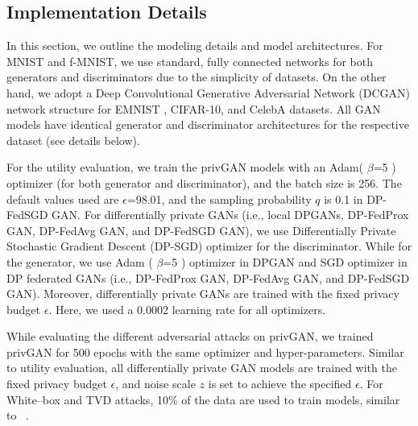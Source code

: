 \onecolumn
\appendix


\subsection{Implementation Details}


In this section, we outline the modeling details and model architectures. For MNIST and f-MNIST, we use standard, fully connected networks for both generators and discriminators due to the simplicity of datasets. On the other hand, we adopt a Deep Convolutional Generative Adversarial Network (DCGAN) network structure for EMNIST \cite{cohen2017emnist}, CIFAR-10, and CelebA datasets. All GAN models have identical generator and discriminator architectures for the respective dataset (see details below). 


For the utility evaluation, we train the privGAN models with an Adam( $\beta$=5 ) optimizer (for both generator and discriminator), and the batch size is 256. The default values used are $\epsilon$=98.01,  and the sampling probability $q$ is 0.1 in DP-FedSGD GAN. For  differentially private GANs (i.e., local DPGANs, DP-FedProx GAN, DP-FedAvg GAN, and DP-FedSGD GAN), we use Differentially Private Stochastic Gradient Descent (DP-SGD) optimizer for the discriminator. While for the generator, we use  Adam ( $\beta$=5 ) optimizer in DPGAN and SGD optimizer in DP federated GANs (i.e., DP-FedProx GAN, DP-FedAvg GAN, and DP-FedSGD GAN). Moreover, differentially private GANs are trained with the fixed privacy budget $\epsilon$. Here, we used a 0.0002 learning rate for all optimizers.


 While evaluating the different adversarial attacks on privGAN, we trained privGAN for 500 epochs with the same optimizer and hyper-parameters. Similar to utility evaluation,  all differentially private GAN models are trained with the fixed privacy budget $\epsilon$, and noise scale $z$ is set to achieve the specified $\epsilon$.  For White–box and TVD attacks, 10\% of the data are used to train models, similar to ~\cite{WBAttack2018}.
 
